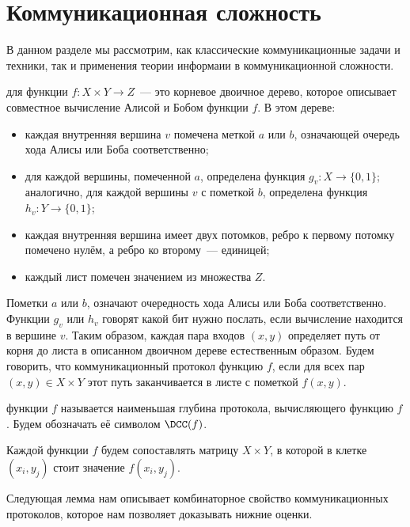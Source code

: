 \section{Коммуникационная сложность}

В данном разделе мы рассмотрим, как классические коммуникационные задачи и техники, так и применения
теории информаии в коммуникационной сложности.

\begin{definition}
     для функции $f\colon X \times Y \to Z$~--- это корневое двоичное
    дерево, которое описывает совместное вычисление Алисой и Бобом функции $f$. В этом дереве:
    \begin{itemize}
        \item каждая внутренняя вершина $v$ помечена меткой $a$ или $b$, означающей очередь хода Алисы
            или Боба соответственно;
        \item для каждой вершины, помеченной $a$, определена функция $g_v\colon X \to \{0, 1\}$;
            аналогично, для каждой вершины $v$ с пометкой $b$, определена функция $h_v\colon Y \to \{0,
            1\}$;
        \item каждая внутренняя вершина имеет двух потомков, ребро к первому потомку помечено нулём, а
            ребро ко второму~--- единицей;
        \item каждый лист помечен значением из множества $Z$.
    \end{itemize}

    Пометки $a$ или $b$, означают очередность хода Алисы или Боба соответственно. Функции $g_v$ или $h_v$
    говорят какой бит нужно послать, если вычисление находится в вершине $v$. Таким образом, каждая пара
    входов $(x, y)$ определяет путь от корня до листа в описанном двоичном дереве естественным
    образом. Будем говорить, что коммуникационный протокол  функцию $f$, если для всех
    пар $(x, y) \in X \times Y $ этот путь заканчивается в листе с пометкой $f(x, y)$.  
    
     функции $f$ называется наименьшая глубина протокола,
    вычисляющего функцию $f$. Будем обозначать её символом $\DCC(f)$.
    
    Каждой функции $f$ будем сопоставлять матрицу $X \times Y$, в которой в клетке $(x_i, y_j)$ стоит
    значение $f(x_i, y_j)$.
\end{definition}

Следующая лемма нам описывает комбинаторное свойство коммуникационных протоколов, которое нам позволяет
доказывать нижние оценки.

